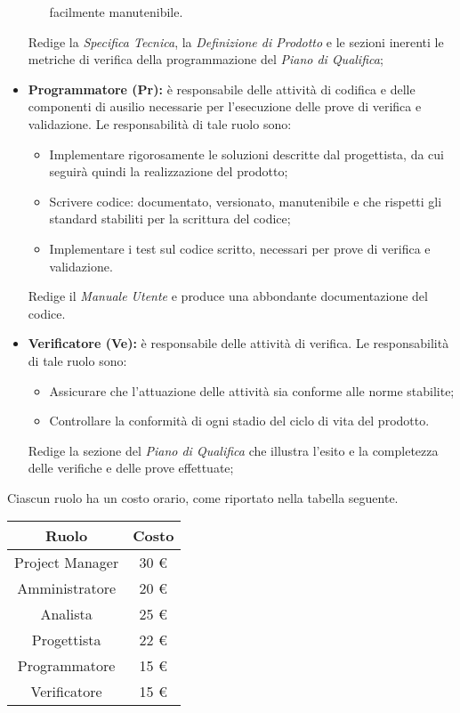 \begin{itemize}
\begin{itemize}
facilmente manutenibile. \\
			\end{itemize}
			Redige la \textit{Specifica Tecnica}, la \textit{Definizione di Prodotto} e le sezioni inerenti le metriche di verifica della programmazione del \textit{Piano di Qualifica};
			\item \textbf{Programmatore (Pr):} è responsabile delle attività di codifica e delle componenti di ausilio necessarie per l'esecuzione delle prove di verifica e validazione. Le responsabilità di tale ruolo sono: \\
			\begin{itemize}
				\item Implementare rigorosamente le soluzioni descritte dal progettista, da cui
seguirà quindi la realizzazione del prodotto; \\
				\item Scrivere codice: documentato, versionato, manutenibile e che rispetti gli
standard stabiliti per la scrittura del codice; \\
				\item Implementare i test sul codice scritto, necessari per prove di verifica e validazione. \\
			\end{itemize}
			Redige il \textit{Manuale Utente} e produce una abbondante documentazione del codice.
			\item \textbf{Verificatore (Ve):} è responsabile delle attività di verifica. Le responsabilità di tale ruolo sono: \\
			\begin{itemize}
				\item Assicurare che l'attuazione delle attività sia conforme alle norme stabilite; \\
				\item Controllare la conformità di ogni stadio del ciclo di vita del prodotto. \\
			\end{itemize}
			Redige la sezione del \textit{Piano di Qualifica} che illustra l'esito e la completezza delle verifiche e delle prove effettuate;
		\end{itemize}
		Ciascun ruolo ha un costo orario, come riportato nella tabella seguente. \\
		\begin{table}[H]
		\centering
		\begin{tabular}{|c|c|}
			\hline
			\textbf{Ruolo}		& \textbf{Costo} \\
			\hline
			Project Manager		& 30 €\\
			Amministratore		& 20 €\\
			Analista			& 25 €\\
			Progettista			& 22 €\\
			Programmatore		& 15 €\\
			Verificatore		& 15 €\\
			\hline
		\end{tabular}
		\end{table}